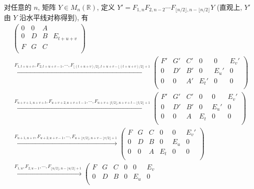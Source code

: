 \documentclass[color=black,device=normal,lang=cn,mode=geye]{elegantnote}
\begin{document}
\begin{solution}
    对任意的 $n$, 矩阵 $Y\in M_{n}(\mathbb{R})$, 定义 $Y'=F_{1,n}F_{2,n-2}\cdots F_{\lfloor n/2\rfloor,n-\lfloor n/2\rfloor}Y$ (直观上, $Y'$ 由 $Y$ 沿水平线对称得到), 有
    \begin{align*}
        & \left(\begin{array}{ccc|c}
            0 & 0 & A & \\
            0 & D & B & E_{t+u+v} \\
            F & G & C & \\
        \end{array}\right) \\
        & \xrightarrow{F_{1,t+u+v},F_{2,t+u+v-1},\cdots,F_{\lfloor(t+u+v)/2\rfloor,t+u+v-\lfloor(t+u+v)/2\rfloor+1}}\left(\begin{array}{ccc|ccc}
            F' & G' & C'& 0   & 0   & E_v' \\
            0  & D' & B'& 0   & E_u' & 0   \\
            0  & 0  & A'& E_t' & 0   & 0   \\
        \end{array}\right) \\
        & \xrightarrow{F_{u+v+1,u+v+t},F_{u+v+2,u+v+t-1},\cdots,F_{u+v+\lfloor t/2\rfloor,u+v+t-\lfloor t/2\rfloor+1}}\left(\begin{array}{ccc|ccc}
            F' & G' & C' & 0   & 0   & E_v' \\
            0  & D' & B' & 0   & E_u' & 0   \\
            0  & 0  & A  & E_t & 0   & 0   \\
        \end{array}\right) \\
        & \xrightarrow{F_{u+1,u+v},F_{u+2,u+v-1},\cdots,F_{u+\lfloor v/2\rfloor,u+v-\lfloor v/2\rfloor+1}}\left(\begin{array}{ccc|ccc}
            F & G & C & 0   & 0   & E_v' \\
            0 & D & B & 0   & E_u & 0   \\
            0 & 0 & A & E_t & 0   & 0   \\
        \end{array}\right) \\
        & \xrightarrow{F_{1,u},F_{2,u-1},\cdots,F_{\lfloor u/2\rfloor,u-\lfloor u/2\rfloor+1}}\left(\begin{array}{ccc|ccc}
            F & G & C & 0   & 0   & E_v \\
            0 & D & B & 0   & E_u & 0   \\

\end{array}
\end{align*}
\end{solution}
\end{document}
